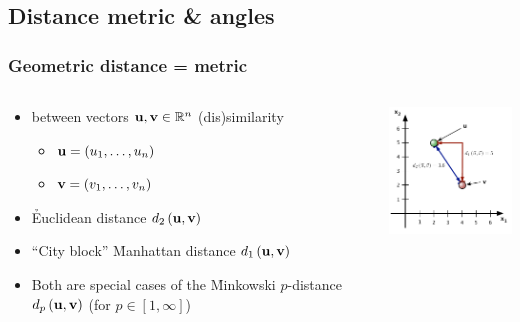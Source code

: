 \documentclass[t]{beamer} %
\begin{document}

\subsection{Distance metric \& angles}

\begin{frame}
  \frametitle{Geometric distance = metric}

  \begin{columns}[T]
    \begin{column}{60mm}
      \begin{itemize}
      \item {} between vectors $\vu, \vv \in \setR^n$ \so
        (dis)similarity
        \begin{itemize}
        \item $\vu = (u_1, \ldots, u_n)$
        \item $\vv = (v_1, \ldots, v_n)$
        \end{itemize}
      \item<2-> \h{Euclidean} distance $\dist[2]{\vu}{\vv}$
      \item<3-> ``City block'' \h{Manhattan} distance $\dist[1]{\vu}{\vv}$
      \item<4-> Both are special cases of the \h{Minkowski} $p$-distance
        $\dist[p]{\vu}{\vv}$ (for $p\in [1, \infty]$)
      \end{itemize}
    \end{column}
    \begin{column}{45mm}
      \includegraphics[width=45mm]{img/7_distance_examples}
    \end{column}
  \end{columns}
  \gap[.5]
\end{frame}
\end{document}
